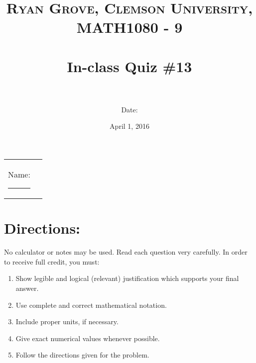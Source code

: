 \documentclass[paper=a4, fontsize=11pt]{scrartcl} %
\title{	
\normalfont \normalsize 
\textsc{Ryan Grove, Clemson University, MATH1080 - 9} \\ [25pt] %
\horrule{0.5pt} \\[0.4cm] %
\huge In-class Quiz \#13 \\ %
\horrule{2pt} \\[0.5cm] %
}
\author{Date:} %
\date{\normalsize April 1, 2016} %
\numberwithin{equation}{section} %
\numberwithin{figure}{section} %
\numberwithin{table}{section} %
\begin{document}
\maketitle %

\begin{flushleft}
\begin{tabular}{l l}
Name: \rule{3.2in}{.01cm}  & {}%
\end{tabular}
\end{flushleft}


\section*{\textbf{Directions:}}

No calculator or notes may be used.  Read each question very carefully.  In order to receive full credit, you must:
\begin{enumerate}
\item Show legible and logical (relevant) justification which supports your final answer.
\item Use complete and correct mathematical notation.
\item Include proper units, if necessary.
\item Give exact numerical values whenever possible.
\item Follow the directions given for the problem.
\end{enumerate}
\vspace{.1in}

\newpage
\end{document}
